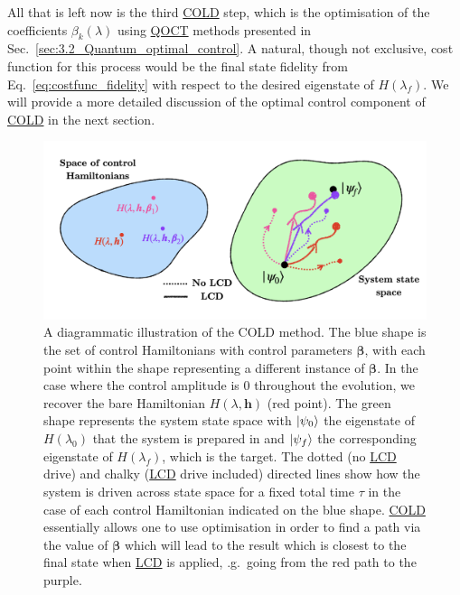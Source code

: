 \documentclass[a4paper,oneside,11pt]{book}
\newcommand{\betabb}{\boldsymbol{\beta}}
\newcommand{\hbb}{\boldsymbol{h}}
\newcommand{\acrref}[1]{\hyperref[acr:#1]{#1}}
\begin{document}
All that is left now is the third \acrref{COLD} step, which is the optimisation of the coefficients $\beta_k(\lambda)$ using \acrref{QOCT} methods presented in Sec.~\ref{sec:3.2_Quantum_optimal_control}. A natural, though not exclusive, cost function for this process would be the final state fidelity from Eq.~\eqref{eq:costfunc_fidelity} with respect to the desired eigenstate of $H(\lambda_f)$. We will provide a more detailed discussion of the optimal control component of \acrref{COLD} in the next section.

\begin{figure}[t]
    \centering
    \includegraphics[width=0.8\linewidth]{images/COLD_illustration.png} \caption[A diagrammatic illustration of the COLD method]{A diagrammatic illustration of the COLD method. The blue shape is the set of control Hamiltonians with control parameters $\betabb$, with each point within the shape representing a different instance of $\betabb$. In the case where the control amplitude is $0$ throughout the evolution, we recover the bare Hamiltonian $H(\lambda, \hbb)$ (red point). The green shape represents the system state space with $\ket{\psi_0}$ the eigenstate of $H(\lambda_0)$ that the system is prepared in and $\ket{\psi_f}$ the corresponding eigenstate of $H(\lambda_f)$, which is the target. The dotted (no \acrref{LCD} drive) and chalky (\acrref{LCD} drive included) directed lines show how the system is driven across state space for a fixed total time $\tau$ in the case of each control Hamiltonian indicated on the blue shape. \acrref{COLD} essentially allows one to use optimisation in order to find a path via the value of $\betabb$ which will lead to the result which is closest to the final state when \acrref{LCD} is applied, \@e.g.~going from the red path to the purple.}\label{fig:COLD_illustration}
\end{figure}
\end{document}

